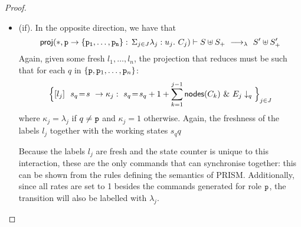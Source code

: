 \begin{proof}
\begin{itemize}
  \item (if). In the opposite direction, we have that 
    $$\mathsf{proj} (*, \mathtt{p}\rightarrow \{\mathtt{\mathtt{p}_1,\ldots,\mathtt{p}_n}\}:\,\Sigma_{j\in J}\lambda_j: u_j.\ C_j)\vdash
    S\uplus S_{+}\ \longrightarrow_{\lambda}\  S'\uplus S_{+}'$$
    Again, given some fresh $l_1,\ldots, l_n$, the projection that
    reduces must be such that for each $q$ in
    $\{\mathtt{p}, \mathtt{p}_1,\ldots,\mathtt{p}_n\}$:
    $$
    \Big\{\commandBase {l_j} {\ s_{q}\!=\! s} {\kappa_j:\ s_{q}\!=\!
      s_{q} +1+\sum_{k=1}^{j-1}\mathsf{nodes}({C_k})}\ \&\ \projE
    {E_j}q\Big\}_{j\in J}
    $$
    where $\kappa_j=\lambda_j$ if $q\neq\mathtt{p}$ and $\kappa_j=1$
    otherwise. 
    Again, the freshness of the labels $l_j$ together with the working
    states $s_qq$

    Because the labels $l_j$ are fresh and the state counter is unique
    to this interaction, these are the only commands that can
    synchronise together: this can be shown from the rules defining
    the semantics of PRISM. Additionally, since all rates are set to 1
    besides the commands generated for role $\mathtt{p}$, the transition
    will also be labelled with $\lambda_j$.

  \end{itemize}
\end{proof}

